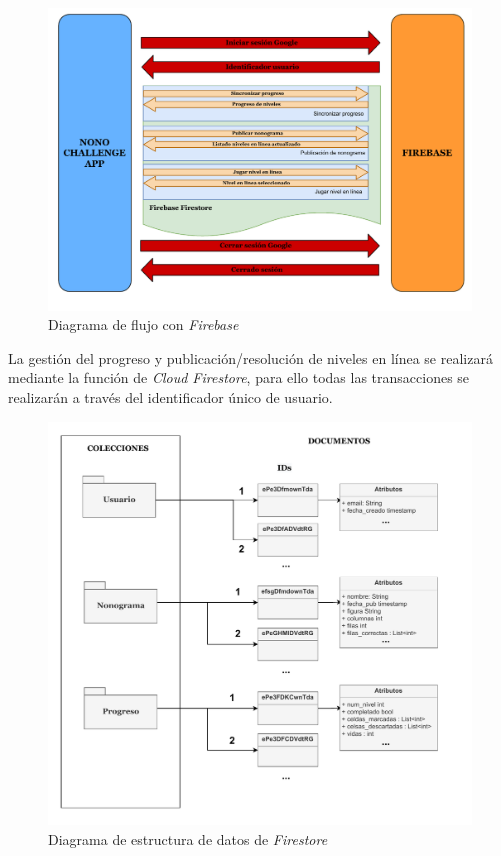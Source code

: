 \begin{figure}[H]
  \centering
  \includegraphics[scale=0.8]{images/back_diagram.pdf}
  \caption{Diagrama de flujo con \textit{Firebase}}
  \label{fig:backdiagram1}
\end{figure}

La gestión del progreso y publicación/resolución de niveles en línea se realizará mediante la función de \textit{Cloud Firestore},
para ello todas las transacciones se realizarán a través del identificador único de usuario.

\begin{figure}[H]
  \centering
  \includegraphics[scale=0.55]{images/firestore.pdf}
  \caption{Diagrama de estructura de datos de \textit{Firestore}}
  \label{fig:firestore1}
\end{figure}

